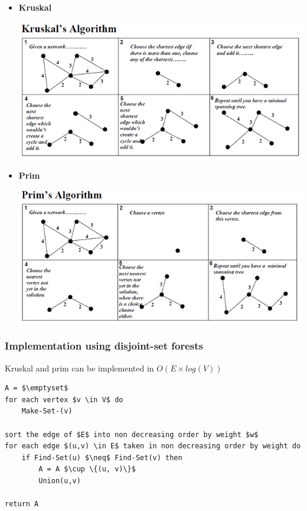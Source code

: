 \begin{itemize}
    \item \textbf{Kruskal}  
        
        \includegraphics[width=14cm]{img/kruskalAlgo}
    \item \textbf{Prim} 
        
        \includegraphics[width=14cm]{img/primAlgo}
\end{itemize}

\subsubsection{Implementation using disjoint-set forests}
Kruskal and prim can be implemented in $O(E \times log(V))$

\begin{lstlisting}[mathescape, caption=MST-Kruskal(G\,w)]
A = $\emptyset$
for each vertex $v \in V$ do
    Make-Set-(v)

sort the edge of $E$ into non decreasing order by weight $w$
for each edge $(u,v) \in E$ taken in non decreasing order by weight do
    if Find-Set(u) $\neq$ Find-Set(v) then
        A = A $\cup \{(u, v)\}$
        Union(u,v)

return A
\end{lstlisting}

